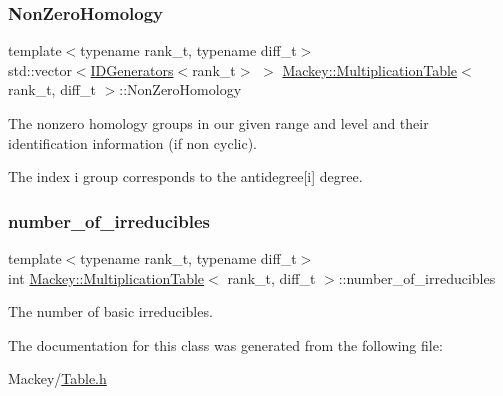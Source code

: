\subsubsection{\texorpdfstring{Non\+Zero\+Homology}{NonZeroHomology}}
{\footnotesize\ttfamily template$<$typename rank\+\_\+t, typename diff\+\_\+t$>$ \\
std\+::vector$<$\hyperlink{classMackey_1_1IDGenerators}{I\+D\+Generators}$<$rank\+\_\+t$>$ $>$ \hyperlink{classMackey_1_1MultiplicationTable}{Mackey\+::\+Multiplication\+Table}$<$ rank\+\_\+t, diff\+\_\+t $>$\+::Non\+Zero\+Homology\hspace{0.3cm}{\ttfamily [protected]}}



The nonzero homology groups in our given range and level and their identification information (if non cyclic). 

The index i group corresponds to the antidegree\mbox{[}i\mbox{]} degree. \mbox{\label{classMackey_1_1MultiplicationTable_a2a87b9a2f25f4e99c903c8f874fad4fb}} 
\subsubsection{\texorpdfstring{number\+\_\+of\+\_\+irreducibles}{number\_of\_irreducibles}}
{\footnotesize\ttfamily template$<$typename rank\+\_\+t, typename diff\+\_\+t$>$ \\
int \hyperlink{classMackey_1_1MultiplicationTable}{Mackey\+::\+Multiplication\+Table}$<$ rank\+\_\+t, diff\+\_\+t $>$\+::number\+\_\+of\+\_\+irreducibles\hspace{0.3cm}{\ttfamily [protected]}}



The number of basic irreducibles. 



The documentation for this class was generated from the following file\+:\begin{DoxyCompactItemize}
\item 
Mackey/\hyperlink{Table_8h}{Table.\+h}\end{DoxyCompactItemize}
